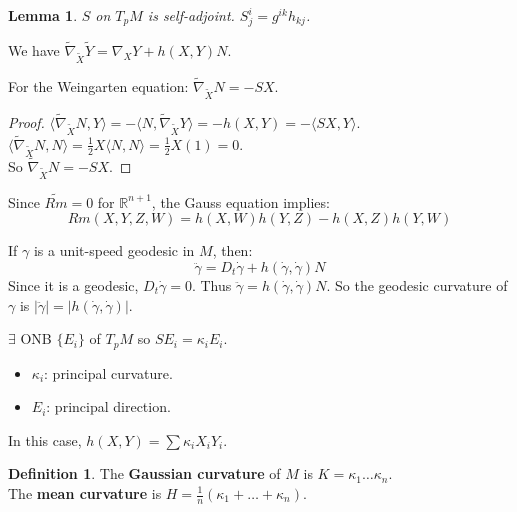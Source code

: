 \documentclass[11pt, a4paper]{article}
\theoremstyle{plain}
\newtheorem{lemma}[theorem]{Lemma}
\theoremstyle{definition}
\newtheorem{definition}[theorem]{Definition}
\theoremstyle{remark}
\begin{document}
{\begin{lemma}
$S$ on $T_pM$ is self-adjoint. $S_j^i = g^{ik} h_{kj}$.
\end{lemma}

We have $\tilde{\nabla}_{\tilde{X}} \tilde{Y} = \nabla_X Y + h(X,Y)N$.

For the Weingarten equation: $\tilde{\nabla}_{\tilde{X}} N = -SX$.
\begin{proof}
$\langle \tilde{\nabla}_{\tilde{X}} N, Y \rangle = -\langle N, \tilde{\nabla}_{\tilde{X}} Y \rangle = -h(X,Y) = -\langle SX, Y \rangle$. \\
$\langle \tilde{\nabla}_{\tilde{X}} N, N \rangle = \frac{1}{2} X\langle N,N \rangle = \frac{1}{2} X(1) = 0$. \\
So $\tilde{\nabla}_{\tilde{X}} N = -SX$.
\end{proof}

Since $\tilde{Rm} = 0$ for $\mathbb{R}^{n+1}$, the Gauss equation implies:
\[ Rm(X,Y,Z,W) = h(X,W)h(Y,Z) - h(X,Z)h(Y,W) \]

If $\gamma$ is a unit-speed geodesic in $M$, then:
\[ \ddot{\gamma} = D_t \dot{\gamma} + h(\dot{\gamma}, \dot{\gamma})N \]
Since it is a geodesic, $D_t \dot{\gamma} = 0$. Thus $\ddot{\gamma} = h(\dot{\gamma}, \dot{\gamma})N$. 
So the geodesic curvature of $\gamma$ is $|\ddot{\gamma}| = |h(\dot{\gamma}, \dot{\gamma})|$.

$\exists$ ONB $\{E_i\}$ of $T_pM$ so $S E_i = \kappa_i E_i$.
\begin{itemize}
    \item $\kappa_i$: principal curvature.
    \item $E_i$: principal direction.
\end{itemize}
In this case, $h(X,Y) = \sum \kappa_i X_i Y_i$.

\begin{definition}
The \textbf{Gaussian curvature} of $M$ is $K = \kappa_1 \dots \kappa_n$. \\
The \textbf{mean curvature} is $H = \frac{1}{n}(\kappa_1 + \dots + \kappa_n)$.
\end{definition}

}
\end{document}
